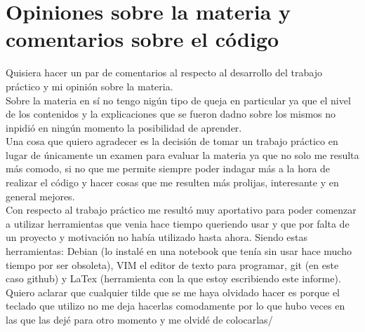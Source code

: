 \documentclass[oneside]{article}
\begin{document}
	\section*{Opiniones sobre la materia y comentarios sobre el código}
	Quisiera hacer un par de comentarios al respecto al desarrollo del trabajo práctico y mi opinión sobre la materia.\\
	Sobre la materia en sí no tengo nigún tipo de queja en particular  ya que el nivel de los contenidos y la explicaciones que se fueron dadno sobre los mismos no inpidió en ningún momento la posibilidad de aprender.\\
	Una cosa que quiero agradecer es la decisión de tomar un trabajo práctico en lugar de únicamente un examen para evaluar la materia ya que no solo me resulta más 	comodo, si no que me permite siempre poder indagar más a la hora de realizar el código y hacer cosas que me resulten más prolijas, interesante y en general mejores.\\
	Con respecto al trabajo práctico me resultó muy aportativo para poder comenzar a utilizar herramientas que venia hace tiempo queriendo usar y que por falta de un proyecto y motivación no había utilizado hasta ahora. Siendo estas herramientas: Debian (lo instalé en una notebook que tenía sin usar hace mucho tiempo por ser obsoleta), VIM el editor de texto para programar, git (en este caso github) y LaTex (herramienta con la que estoy escribiendo este informe).\\
	Quiero aclarar que cualquier tilde que se me haya olvidado hacer es porque el teclado que utilizo no me deja hacerlas comodamente por lo que hubo veces en las que las dejé para otro momento y me olvidé de colocarlas/
	
	\newpage
	\thispagestyle{fancy}	
\end{document}
